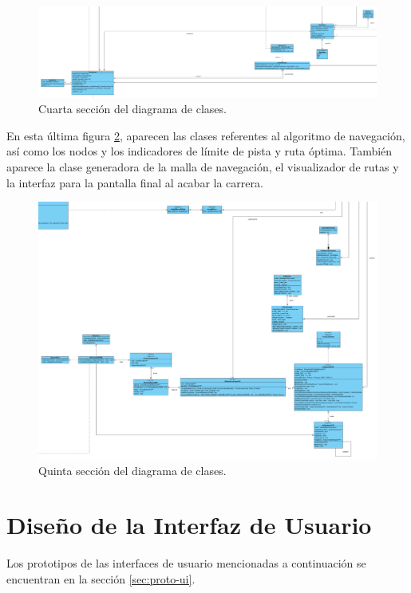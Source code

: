 \begin{figure}[H]
    \centering
    \includegraphics[width=\textwidth]{imagenes/classDiagram4.png}
    \caption{Cuarta sección del diagrama de clases.}
    \label{fig:class4}
\end{figure}

En esta última figura \ref{fig:class5}, aparecen las clases referentes al algoritmo de navegación, así como los nodos y los indicadores de límite de pista y ruta óptima. También aparece la clase generadora de la malla de navegación, el visualizador de rutas y la interfaz para la pantalla final al acabar la carrera.

\begin{figure}[H]
    \centering
    \includegraphics[width=\textwidth]{imagenes/classDiagram5.png}
    \caption{Quinta sección del diagrama de clases.}
    \label{fig:class5}
\end{figure}


\section{Diseño de la Interfaz de Usuario}

Los prototipos de las interfaces de usuario mencionadas a continuación se encuentran en la sección \ref{sec:proto-ui}.

